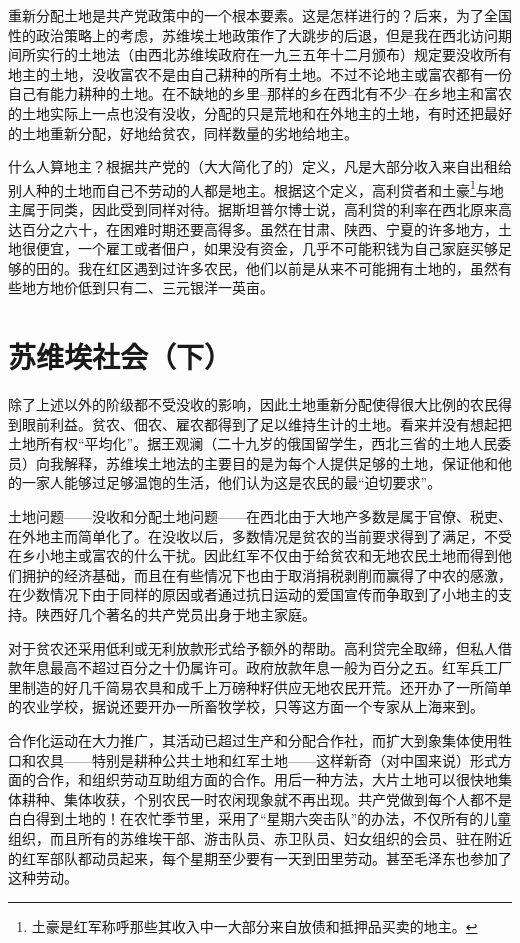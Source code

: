 \documentclass[10pt]{book}
\begin{document}
重新分配土地是共产党政策中的一个根本要素。这是怎样进行的？后来，为了全国性的政治策略上的考虑，苏维埃土地政策作了大跳步的后退，但是我在西北访问期间所实行的土地法（由西北苏维埃政府在一九三五年十二月颁布）规定要没收所有地主的土地，没收富农不是由自己耕种的所有土地。不过不论地主或富农都有一份自己有能力耕种的土地。在不缺地的乡里--那样的乡在西北有不少--在乡地主和富农的土地实际上一点也没有没收，分配的只是荒地和在外地主的土地，有时还把最好的土地重新分配，好地给贫农，同样数量的劣地给地主。

什么人算地主？根据共产党的（大大简化了的）定义，凡是大部分收入来自出租给别人种的土地而自己不劳动的人都是地主。根据这个定义，高利贷者和土豪\footnote{土豪是红军称呼那些其收入中一大部分来自放债和抵押品买卖的地主。}与地主属于同类，因此受到同样对待。据斯坦普尔博士说，高利贷的利率在西北原来高达百分之六十，在困难时期还要高得多。虽然在甘肃、陕西、宁夏的许多地方，土地很便宜，一个雇工或者佃户，如果没有资金，几乎不可能积钱为自己家庭买够足够的田的。我在红区遇到过许多农民，他们以前是从来不可能拥有土地的，虽然有些地方地价低到只有二、三元银洋一英亩。



\section{苏维埃社会（下）}

除了上述以外的阶级都不受没收的影响，因此土地重新分配使得很大比例的农民得到眼前利益。贫农、佃农、雇农都得到了足以维持生计的土地。看来并没有想起把土地所有权“平均化”。据王观澜（二十九岁的俄国留学生，西北三省的土地人民委员）向我解释，苏维埃土地法的主要目的是为每个人提供足够的土地，保证他和他的一家人能够过足够温饱的生活，他们认为这是农民的最“迫切要求”。

土地问题——没收和分配土地问题——在西北由于大地产多数是属于官僚、税吏、在外地主而简单化了。在没收以后，多数情况是贫农的当前要求得到了满足，不受在乡小地主或富农的什么干扰。因此红军不仅由于给贫农和无地农民土地而得到他们拥护的经济基础，而且在有些情况下也由于取消捐税剥削而赢得了中农的感激，在少数情况下由于同样的原因或者通过抗日运动的爱国宣传而争取到了小地主的支持。陕西好几个著名的共产党员出身于地主家庭。

对于贫农还采用低利或无利放款形式给予额外的帮助。高利贷完全取缔，但私人借款年息最高不超过百分之十仍属许可。政府放款年息一般为百分之五。红军兵工厂里制造的好几千简易农具和成千上万磅种籽供应无地农民开荒。还开办了一所简单的农业学校，据说还要开办一所畜牧学校，只等这方面一个专家从上海来到。

合作化运动在大力推广，其活动已超过生产和分配合作社，而扩大到象集体使用牲口和农具——特别是耕种公共土地和红军土地——这样新奇（对中国来说）形式方面的合作，和组织劳动互助组方面的合作。用后一种方法，大片土地可以很快地集体耕种、集体收获，个别农民一时农闲现象就不再出现。共产党做到每个人都不是白白得到土地的！在农忙季节里，采用了“星期六突击队”的办法，不仅所有的儿童组织，而且所有的苏维埃干部、游击队员、赤卫队员、妇女组织的会员、驻在附近的红军部队都动员起来，每个星期至少要有一天到田里劳动。甚至毛泽东也参加了这种劳动。
\end{document}
